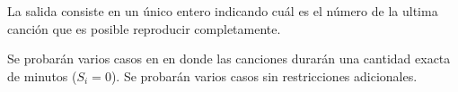 \documentclass{oci}
\begin{document}
\begin{outputDescription}
  La salida consiste en un único entero indicando cuál es el número 
de la ultima canción que es posible reproducir completamente.
\end{outputDescription}

\begin{scoreDescription}
   Se probarán varios casos en en donde las canciones durarán una cantidad
  exacta de minutos ($S_i = 0$).
   Se probarán varios casos sin restricciones adicionales. 
\end{scoreDescription}

\begin{sampleDescription}
\end{sampleDescription}
\end{document}
